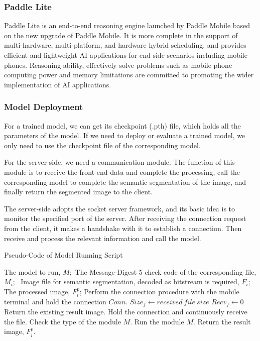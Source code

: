 \subsubsection{Paddle Lite}
Paddle Lite \cite{paddlelite} is an end-to-end reasoning engine launched by Paddle Mobile based on the new upgrade of Paddle Mobile. It is more complete in the support of multi-hardware, multi-platform, and hardware hybrid scheduling, and provides efficient and lightweight AI applications for end-side scenarios including mobile phones. Reasoning ability, effectively solve problems such as mobile phone computing power and memory limitations are committed to promoting the wider implementation of AI applications.

\subsubsection{Model Deployment}


For a trained model, we can get its checkpoint (.pth) file, which holds all the parameters of the model. If we need to deploy or evaluate a trained model, we only need to use the checkpoint file of the corresponding model.


For the server-side, we need a communication module. The function of this module is to receive the front-end data and complete the processing, call the corresponding model to complete the semantic segmentation of the image, and finally return the segmented image to the client.


The server-side adopts the socket server framework, and its basic idea is to monitor the specified port of the server. After receiving the connection request from the client, it makes a handshake with it to establish a connection. Then receive and process the relevant information and call the model.


\begin{algorithm} 
	\caption{Pseudo-Code of Model Running Script} 
	\label{alg3} 
	\begin{algorithmic}
		\REQUIRE 
        The model to run, $M$;\ The Message-Digest 5 check code of the corresponding file, $M_i$;
        \ Image file for semantic segmentation, decoded as bitstream is required, $F_i$;
		\ENSURE 
        The processed image, $F^p_i$;
		\STATE Perform the connection procedure with the mobile terminal and hold the connection $Conn$.
        \STATE $Size_f \gets received\  file\  size$
        \STATE $Recv_f \gets 0$ 
		\ELSE 
		\STATE Return the existing result image.
		\ENDIF
		\STATE Hold the connection and continuously receive the file.
		\ENDWHILE 
		\STATE Check the type of the module $M$.
		\STATE Run the module $M$.
		\STATE Return the result image, $F^p_i$.

	\end{algorithmic} 
\end{algorithm}



\clearpage
